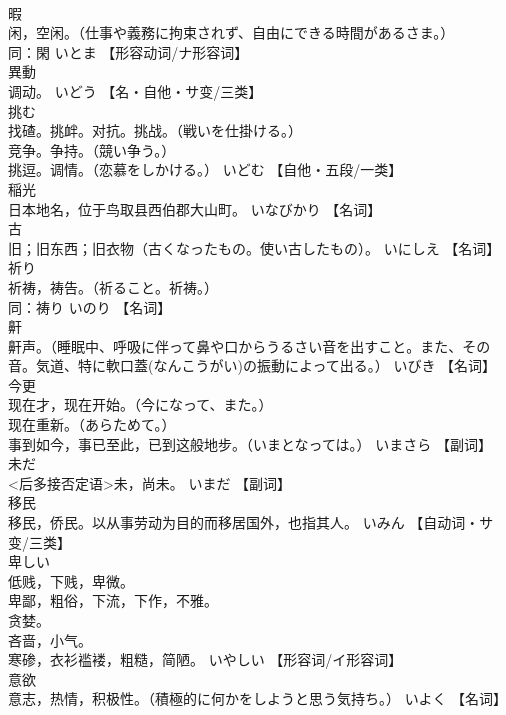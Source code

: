 \documentclass[8pt]{extreport}
\begin{document}
\begin{CJK}{UTF8}{min}
\\	暇	
\\	闲，空闲。（仕事や義務に拘束されず、自由にできる時間があるさま。） 
\\	同：閑	いとま		【形容动词/ナ形容词】
\\	異動	
\\	调动。	いどう		【名・自他・サ变/三类】
\\	挑む	
\\	找碴。挑衅。对抗。挑战。（戦いを仕掛ける。） 
\\	竞争。争持。（競い争う。） 
\\	挑逗。调情。（恋慕をしかける。）	いどむ		【自他・五段/一类】
\\	稲光	
\\	日本地名，位于鸟取县西伯郡大山町。	いなびかり		【名词】
\\	古	
\\	旧；旧东西；旧衣物（古くなったもの。使い古したもの）。	いにしえ		【名词】
\\	祈り	
\\	祈祷，祷告。（祈ること。祈祷。） 
\\	同：祷り	いのり		【名词】
\\	鼾	
\\	鼾声。（睡眠中、呼吸に伴って鼻や口からうるさい音を出すこと。また、その音。気道、特に軟口蓋(なんこうがい)の振動によって出る。）	いびき		【名词】
\\	今更	
\\	现在才，现在开始。（今になって、また。） 
\\	现在重新。（あらためて。） 
\\	事到如今，事已至此，已到这般地步。（いまとなっては。）	いまさら		【副词】
\\	未だ	
\\	<后多接否定语>未，尚未。	いまだ		【副词】
\\	移民	
\\	移民，侨民。以从事劳动为目的而移居国外，也指其人。	いみん		【自动词・サ变/三类】
\\	卑しい	
\\	低贱，下贱，卑微。 
\\	卑鄙，粗俗，下流，下作，不雅。 
\\	贪婪。 
\\	吝啬，小气。 
\\	寒碜，衣衫褴褛，粗糙，简陋。	いやしい		【形容词/イ形容词】
\\	意欲	
\\	意志，热情，积极性。（積極的に何かをしようと思う気持ち。）	いよく		【名词】

\end{CJK}
\end{document}
